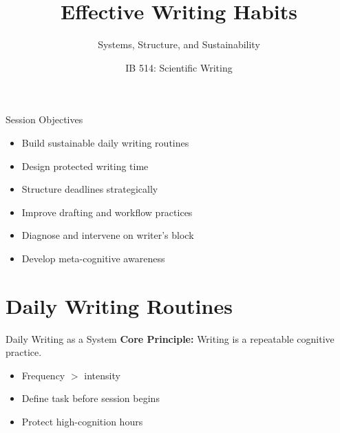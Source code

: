 \documentclass{beamer}
\title{Effective Writing Habits}
\subtitle{Systems, Structure, and Sustainability}
\author[]{IB 514: Scientific Writing}
\date[]{}
\begin{document}
\begin{frame}
  \titlepage
\end{frame}

\begin{frame}{Session Objectives}
\begin{itemize}
    \item Build sustainable daily writing routines
    \item Design protected writing time
    \item Structure deadlines strategically
    \item Improve drafting and workflow practices
    \item Diagnose and intervene on writer’s block
    \item Develop meta-cognitive awareness
\end{itemize}
\end{frame}

\section{Daily Writing Routines}

\begin{frame}{Daily Writing as a System}
\textbf{Core Principle:} Writing is a repeatable cognitive practice.

\begin{itemize}
    \item Frequency $>$ intensity
    \item Define task before session begins
    \item Protect high-cognition hours
\end{itemize}
\end{frame}

\end{document}

